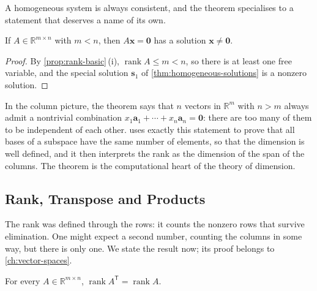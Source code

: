 A homogeneous system is always consistent, and the theorem specialises to a statement that deserves a name of its own.

\begin{theorem}
\label{thm:more-unknowns}
If $A\in\mathbb R^{m\times n}$ with $m<n$, then $A\mathbf x=\mathbf 0$ has a solution $\mathbf x\ne\mathbf 0$.
\end{theorem}

\begin{proof}
By \cref{prop:rank-basic}\,(i), $\operatorname{rank}A\le m<n$, so there is at least one free variable, and the special solution $\mathbf s_1$ of \cref{thm:homogeneous-solutions} is a nonzero solution.
\end{proof}

In the column picture, the theorem says that $n$ vectors in $\mathbb R^m$ with $n>m$ always admit a nontrivial combination $x_1\mathbf a_1+\cdots+x_n\mathbf a_n=\mathbf 0$: there are too many of them to be independent of each other.  uses exactly this statement to prove that all bases of a subspace have the same number of elements, so that the dimension is well defined, and it then interprets the rank as the dimension of the span of the columns. The theorem is the computational heart of the theory of dimension.

\subsection{Rank, Transpose and Products}

The rank was defined through the rows: it counts the nonzero rows that survive elimination. One might expect a second number, counting the columns in some way, but there is only one. We state the result now; its proof belongs to \cref{ch:vector-spaces}.

\begin{theorem}
\label{thm:rank-transpose}
For every $A\in\mathbb R^{m\times n}$, $\operatorname{rank}A^{\mathsf T}=\operatorname{rank}A$.
\end{theorem}

